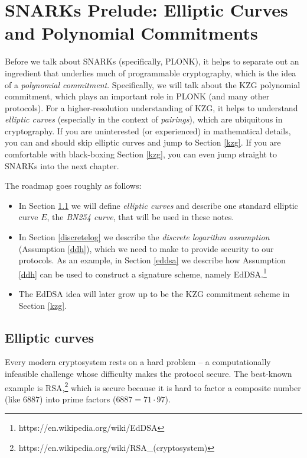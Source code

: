 \section{SNARKs Prelude: Elliptic Curves and Polynomial Commitments}

Before we talk about SNARKs (specifically, PLONK), it helps to separate
out an ingredient that underlies much of programmable cryptography,
which is the idea of a \emph{polynomial commitment}. Specifically, we
will talk about the KZG polynomial commitment, which plays an important
role in PLONK (and many other protocols). For a higher-resolution
understanding of KZG, it helps to understand \emph{elliptic curves}
(especially in the context of \emph{pairings}), which are ubiquitous in
cryptography. If you are uninterested (or experienced) in mathematical
details, you can and should skip elliptic curves and jump to Section \ref{kzg}.
If you are comfortable with black-boxing Section \ref{kzg}, you can even jump
straight to SNARKs into the next chapter.

The roadmap goes roughly as follows:

\begin{itemize}
\item
  In Section \ref{ec} we will define \emph{elliptic curves} and
  describe one standard elliptic curve \(E\), the \emph{BN254 curve},
  that will be used in these notes.
\item
  In Section \ref{discretelog} we describe the
  \emph{discrete logarithm assumption} (Assumption \ref{ddh}),
  which we need to make to provide security to our protocols. As an
  example, in Section \ref{eddsa} we describe how
  Assumption \ref{ddh} can be used to construct a signature scheme,
  namely EdDSA.\footnote{https://en.wikipedia.org/wiki/EdDSA}
\item
  The EdDSA idea will later grow up to be the KZG commitment scheme in
  Section \ref{kzg}.
\end{itemize}

\subsection{Elliptic curves}\label{ec}

Every modern cryptosystem rests on a hard problem -- a computationally
infeasible challenge whose difficulty makes the protocol secure. The
best-known example is RSA,\footnote{https://en.wikipedia.org/wiki/RSA\_(cryptosystem)}
which is secure because it is hard to factor a composite number (like
\(6887\)) into prime factors (\(6887 = 71 \cdot 97\)).

